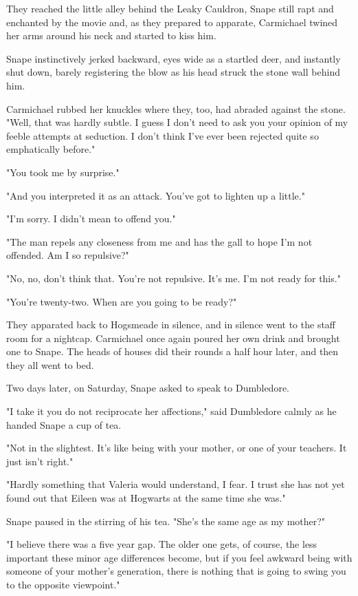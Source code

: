 They reached the little alley behind the Leaky Cauldron, Snape still rapt and enchanted by the movie and, as they prepared to apparate, Carmichael twined her arms around his neck and started to kiss him.

Snape instinctively jerked backward, eyes wide as a startled deer, and instantly shut down, barely registering the blow as his head struck the stone wall behind him.

Carmichael rubbed her knuckles where they, too, had abraded against the stone. "Well, that was hardly subtle. I guess I don't need to ask you your opinion of my feeble attempts at seduction. I don't think I've ever been rejected quite so emphatically before."

"You took me by surprise."

"And you interpreted it as an attack. You've got to lighten up a little."

"I'm sorry. I didn't mean to offend you."

"The man repels any closeness from me and has the gall to hope I'm not offended. Am I so repulsive?"

"No, no, don't think that. You're not repulsive. It's me. I'm not ready for this."

"You're twenty-two. When are you going to be ready?"

They apparated back to Hogsmeade in silence, and in silence went to the staff room for a nightcap. Carmichael once again poured her own drink and brought one to Snape. The heads of houses did their rounds a half hour later, and then they all went to bed.

Two days later, on Saturday, Snape asked to speak to Dumbledore.

"I take it you do not reciprocate her affections," said Dumbledore calmly as he handed Snape a cup of tea.

"Not in the slightest. It's like being with your mother, or one of your teachers. It just isn't right."

"Hardly something that Valeria would understand, I fear. I trust she has not yet found out that Eileen was at Hogwarts at the same time she was."

Snape paused in the stirring of his tea. "She's the same age as my mother?"

"I believe there was a five year gap. The older one gets, of course, the less important these minor age differences become, but if you feel awkward being with someone of your mother's generation, there is nothing that is going to swing you to the opposite viewpoint."

